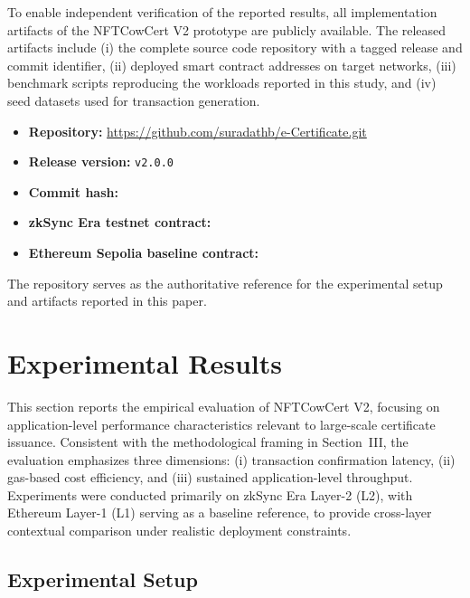 \documentclass[pdflatex,sn-mathphys-num]{sn-jnl}
\begin{document}
To enable independent verification of the reported results, all implementation artifacts of the NFTCowCert V2 prototype are publicly available. The released artifacts include (i) the complete source code repository with a tagged release and commit identifier, (ii) deployed smart contract addresses on target networks, (iii) benchmark scripts reproducing the workloads reported in this study, and (iv) seed datasets used for transaction generation.

\begin{itemize}
\item \textbf{Repository:} \url{https://github.com/suradathb/e-Certificate.git}
\item \textbf{Release version:} \texttt{v2.0.0}
\item \textbf{Commit hash:} \texttt{}
\item \textbf{zkSync Era testnet contract:} \texttt{}
\item \textbf{Ethereum Sepolia baseline contract:} \texttt{}
\end{itemize}

The repository serves as the authoritative reference for the experimental setup and artifacts reported in this paper.

\section{Experimental Results}
\label{sec:results}

This section reports the empirical evaluation of NFTCowCert V2, focusing on application-level performance characteristics relevant to large-scale certificate issuance. Consistent with the methodological framing in Section~III, the evaluation emphasizes three dimensions: (i) transaction confirmation latency, (ii) gas-based cost efficiency, and (iii) sustained application-level throughput. Experiments were conducted primarily on zkSync Era Layer-2 (L2), with Ethereum Layer-1 (L1) serving as a baseline reference, to provide cross-layer contextual comparison under realistic deployment constraints.

\subsection{Experimental Setup}
\end{document}
